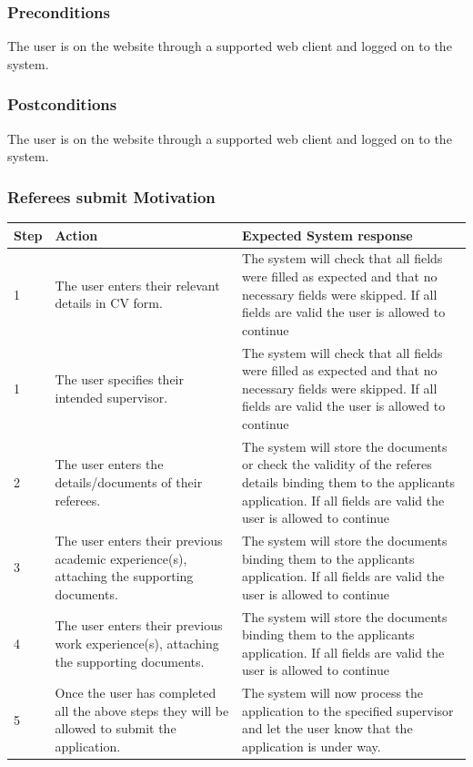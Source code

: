 \documentclass[12pt]{article}
\begin{document}
\subsubsection*{Preconditions}
The user is on the website through a supported web client and logged on to the system.

\subsubsection*{Postconditions}
The user is on the website through a supported web client and logged on to the system.

\subsubsection{Referees submit Motivation}

\begin{center}
\begin{tabular}{|l|p{6cm}|p{8cm}|}
\hline
Step & Action & Expected System response \\
\hline
1 & The user enters their relevant details in CV form.  & The system will check that all fields were filled as expected and that no necessary fields were skipped. If all fields are valid the user is allowed to continue \\
\hline
1 & The user specifies their intended supervisor.  & The system will check that all fields were filled as expected and that no necessary fields were skipped. If all fields are valid the user is allowed to continue \\
\hline
2 & The user enters the details/documents of their referees.  & The system will store the documents or check the validity of the referes details binding them to the applicants application. If all fields are valid the user is allowed to continue \\
\hline
3 & The user enters their previous academic experience(s), attaching the supporting documents.  & The system will store the documents binding them to the applicants application. If all fields are valid the user is allowed to continue \\
\hline
4 & The user enters their previous work experience(s), attaching the supporting documents.  & The system will store the documents binding them to the applicants application. If all fields are valid the user is allowed to continue \\
5 & Once the user has completed all the above steps they will be allowed to submit the application.  & The system will now process the application to the specified supervisor and let the user know that the application is under way. \\
\hline
\end{tabular}
\end{center}
\end{document}
